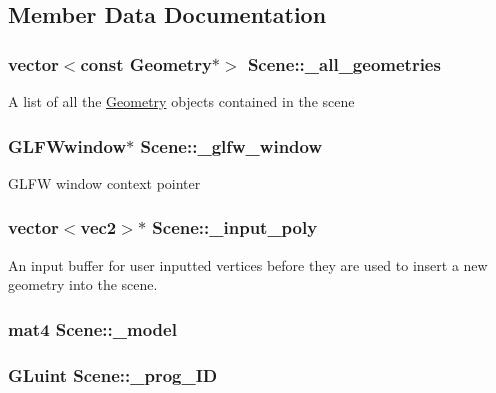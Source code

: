 \subsection{Member Data Documentation}
\hypertarget{class_scene_ae4e39aee440d748c4dc14a5aad13825d}{
\subsubsection[{\+\_\+all\+\_\+geometries}]{\setlength{\rightskip}{0pt plus 5cm}vector$<$const {\bf Geometry}$\ast$$>$ Scene\+::\+\_\+all\+\_\+geometries}}\label{class_scene_ae4e39aee440d748c4dc14a5aad13825d}
A list of all the \hyperlink{class_geometry}{Geometry} objects contained in the scene \hypertarget{class_scene_a90aeef6966c87169d2adfb161772c2c3}{
\subsubsection[{\+\_\+glfw\+\_\+window}]{\setlength{\rightskip}{0pt plus 5cm}G\+L\+F\+Wwindow$\ast$ Scene\+::\+\_\+glfw\+\_\+window}}\label{class_scene_a90aeef6966c87169d2adfb161772c2c3}
G\+L\+F\+W window context pointer \hypertarget{class_scene_a28b649d5aa339d6783672045f8026476}{
\subsubsection[{\+\_\+input\+\_\+poly}]{\setlength{\rightskip}{0pt plus 5cm}vector$<$vec2$>$$\ast$ Scene\+::\+\_\+input\+\_\+poly}}\label{class_scene_a28b649d5aa339d6783672045f8026476}
An input buffer for user inputted vertices before they are used to insert a new geometry into the scene. \hypertarget{class_scene_a2eea7478321942ad8f26f4555e1202c9}{
\subsubsection[{\+\_\+model}]{\setlength{\rightskip}{0pt plus 5cm}mat4 Scene\+::\+\_\+model}}\label{class_scene_a2eea7478321942ad8f26f4555e1202c9}
\hypertarget{class_scene_a30e431c913372130cd9f97c0c1e3d75e}{
\subsubsection[{\+\_\+prog\+\_\+\+I\+D}]{\setlength{\rightskip}{0pt plus 5cm}G\+Luint Scene\+::\+\_\+prog\+\_\+\+I\+D}}\label{class_scene_a30e431c913372130cd9f97c0c1e3d75e}
